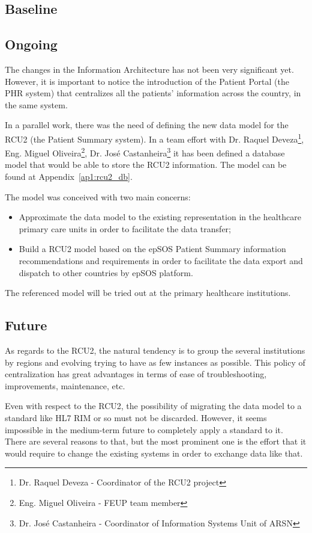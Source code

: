 \subsection{Baseline}
\subsection{Ongoing}

The changes in the Information Architecture has not been very significant yet. However, it is important to notice the introduction of the Patient Portal (the PHR system) that centralizes all the patients' information across the country, in the same system.

In a parallel work, there was the need of defining the new data model for the RCU2 (the Patient Summary system). In a team effort with Dr. Raquel Deveza\footnote{Dr. Raquel Deveza - Coordinator of the RCU2 project}, Eng. Miguel Oliveira\footnote{Eng. Miguel Oliveira - FEUP team member}, Dr. José Castanheira\footnote{Dr. José Castanheira - Coordinator of Information Systems Unit of ARSN} it has been defined a database model that would be able to store the RCU2 information. The model can be found at Appendix~\ref{ap1:rcu2_db}.

The model was conceived with two main concerns:
\begin{itemize}
\item Approximate the data model to the existing representation in the healthcare primary care units in order to facilitate the data transfer;
\item Build a RCU2 model based on the epSOS Patient Summary information recommendations and requirements in order to facilitate the data export and dispatch to other countries by epSOS platform.
\end{itemize}

The referenced model will be tried out at the primary healthcare institutions.



\subsection{Future}

As regards to the RCU2, the natural tendency is to group the several institutions by regions and evolving trying to have as few instances as possible. This policy of centralization has great advantages in terms of ease of troubleshooting, improvements, maintenance, etc. 

Even with respect to the RCU2, the possibility of migrating the data model to a standard like HL7 RIM or so must not be discarded. However, it seems impossible in the medium-term future to completely apply a standard to it. There are several reasons to that, but the most prominent one is the effort that it would require to change the existing systems in order to exchange data like that.

